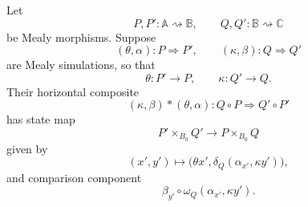 \begin{proposition}
\label{prop:mealy-simulations-horizontal-composition}
    Let
    \[
        P,P':\mathbb A\rightsquigarrow\mathbb B,
        \qquad
        Q,Q':\mathbb B\rightsquigarrow\mathbb C
    \]
    be Mealy morphisms. Suppose
    \[
        (\theta,\alpha):P\Rightarrow P',
        \qquad
        (\kappa,\beta):Q\Rightarrow Q'
    \]
    are Mealy simulations, so that
    \[
        \theta:P'\to P,
        \qquad
        \kappa:Q'\to Q.
    \]
    Their horizontal composite
    \[
        (\kappa,\beta)\ast(\theta,\alpha):
        Q\circ P\Rightarrow Q'\circ P'
    \]
    has state map
    \[
        P'\times_{B_0}Q'
        \longrightarrow
        P\times_{B_0}Q
    \]
    given by
    \[
        (x',y')
        \longmapsto
        \bigl(
            \theta x',
            \delta_Q(\alpha_{x'},\kappa y')
        \bigr),
    \]
    and comparison component
    \[
        \beta_{y'}\circ
        \omega_Q(\alpha_{x'},\kappa y').
    \]
\end{proposition}
